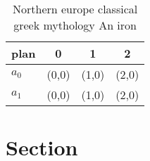 \documentclass[a4paper]{article}
\begin{document}
\begin{table}
\begin{adjustbox}{width=0.5\columnwidth}
\begin{tabular}{|l|l|l|l|}
\hline
\textbf{plan} & \multicolumn{1}{c|}{\textbf{0}} & \multicolumn{1}{c|}{\textbf{1}} & \multicolumn{1}{c|}{\textbf{2}} \\ \hline
\textbf{$a_0$}  & (0,0) & (1,0) & (2,0) \\ \hline
\textbf{$a_1$}  & (0,0) & (1,0) & (2,0) \\ \hline
\end{tabular}
\end{adjustbox}
\caption{Northern europe classical greek mythology An iron
}
\end{table}

\section{Section}
\end{document}
